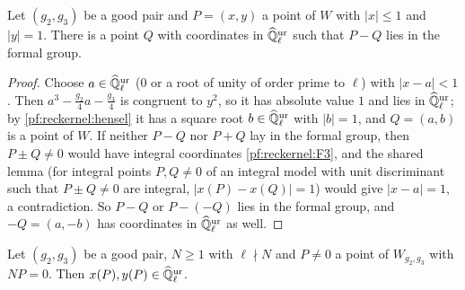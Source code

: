 \begin{lemma}\label{pf:reckernel:torLift}
Let $(g_2,g_3)$ be a good pair and $P=(x,y)$ a point of $W$ with $|x|\le1$ and $|y|=1$. There is a point $Q$ with
coordinates in $\widehat{\mathbb{Q}}{}_\ell^{\mathrm{ur}}$ such that $P-Q$ lies in the formal group.
\end{lemma}

\begin{proof}
Choose $a\in\widehat{\mathbb{Q}}{}_\ell^{\mathrm{ur}}$ ($0$ or a root of unity of order prime to $\ell$) with $|x-a|<1$. Then
$a^3-\frac{g_2}4a-\frac{g_3}4$ is congruent to $y^2$, so it has absolute value $1$ and lies in $\widehat{\mathbb{Q}}{}_\ell^{\mathrm{ur}}$; by
\cref{pf:reckernel:hensel} it has a square root $b\in\widehat{\mathbb{Q}}{}_\ell^{\mathrm{ur}}$ with $|b|=1$, and $Q=(a,b)$ is a point of $W$. If
neither $P-Q$ nor $P+Q$ lay in the formal group, then $P\pm Q\ne0$ would have integral coordinates
\ref{pf:reckernel:F3}, and the shared lemma  (for integral points
$P,Q\ne0$ of an integral model with unit discriminant such that $P\pm Q\ne0$ are integral, $|x(P)-x(Q)|=1$) would
give $|x-a|=1$, a contradiction. So $P-Q$ or $P-(-Q)$ lies in the formal group, and $-Q=(a,-b)$ has coordinates in
$\widehat{\mathbb{Q}}{}_\ell^{\mathrm{ur}}$ as well.
\end{proof}

\begin{theorem}\label{pf:reckernel:torKur}
Let $(g_2,g_3)$ be a good pair, $N\ge1$ with $\ell\nmid N$ and $P\ne0$ a point of $W_{g_2,g_3}$ with $NP=0$. Then
$x(P),y(P)\in\widehat{\mathbb{Q}}{}_\ell^{\mathrm{ur}}$.
\end{theorem}

